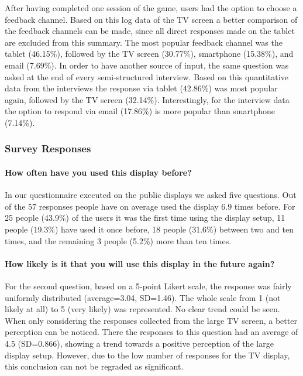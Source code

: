 	After having completed one session of the game, users had the option to choose a feedback channel. Based on this log data of the TV screen a better comparison of the feedback channels can be made, since all direct responses made on the tablet are excluded from this summary. The most popular feedback channel was the tablet (46.15\%), followed by the TV screen (30.77\%), smartphone (15.38\%), and email (7.69\%).
	In order to have another source of input, the same question was asked at the end of every semi-structured interview. Based on this quantitative data from the interviews the response via tablet (42.86\%) was most popular again, followed by the TV screen (32.14\%). Interestingly, for the interview data the option to respond via email (17.86\%) is more popular than smartphone (7.14\%). 
		
	






	\subsubsection{Survey Responses}
	\label{5:results:survey}




	\paragraph{How often have you used this display before?}
	In our questionnaire executed on the public displays we asked five questions. Out of the 57 responses people have on average used the display 6.9 times before. For 25 people (43.9\%) of the users it was the first time using the display setup, 11 people (19.3\%) have used it once before, 18 people (31.6\%) between two and ten times, and the remaining 3 people (5.2\%) more than ten times.

	\paragraph{How likely is it that you will use this display in the future again?}
	For the second question, based on a 5-point Likert scale, the response was fairly uniformly distributed (average=3.04, SD=1.46). The whole scale from 1 (not likely at all) to 5 (very likely) was represented. No clear trend could be seen. When only considering the responses collected from the large TV screen, a better perception can be noticed. There the responses to this question had an average of 4.5 (SD=0.866), showing a trend towards a positive perception of the large display setup. However, due to the low number of responses for the TV display, this conclusion can not be regraded as significant. 

